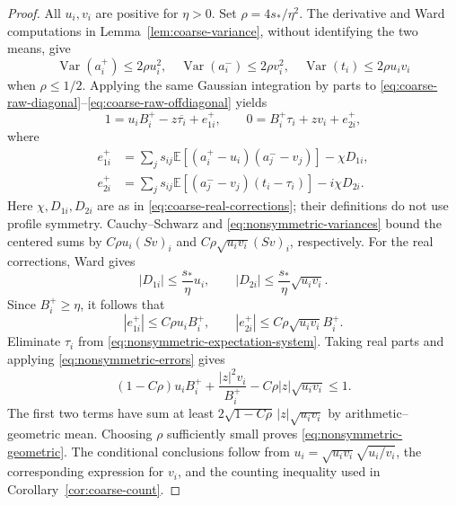 \documentclass[11pt,reqno]{amsart}
\numberwithin{equation}{section}
\theoremstyle{plain}
\theoremstyle{definition}
\theoremstyle{remark}
\begin{document}
\begin{proof}
All $u_i,v_i$ are positive for $\eta>0$.
Set $\rho=4s_*/\eta^2$.  The derivative and Ward computations in
Lemma~\ref{lem:coarse-variance}, without identifying the two means, give
\begin{equation}\label{eq:nonsymmetric-variances}
 \operatorname{Var}(a_i^+)\leq2\rho u_i^2,\quad
 \operatorname{Var}(a_i^-)\leq2\rho v_i^2,\quad
 \operatorname{Var}(t_i)\leq2\rho u_iv_i
\end{equation}
when $\rho\leq1/2$.
Applying the same Gaussian integration by parts to
\eqref{eq:coarse-raw-diagonal}--\eqref{eq:coarse-raw-offdiagonal} yields
\begin{equation}\label{eq:nonsymmetric-expectation-system}
 1=u_iB_i^+-z\overline{\tau_i}+e_{1i}^+,
 \qquad 0=B_i^+\tau_i+zv_i+e_{2i}^+,
\end{equation}
where
\begin{align*}
 e_{1i}^+
 &=\sum_js_{ij}\mathbb E[(a_i^+-u_i)(a_j^--v_j)]-\chi D_{1i},\\
 e_{2i}^+
 &=\sum_js_{ij}\mathbb E[(a_j^--v_j)(t_i-\tau_i)]-i\chi D_{2i}.
\end{align*}
Here $\chi,D_{1i},D_{2i}$ are as in
\eqref{eq:coarse-real-corrections}; their definitions do not use
profile symmetry.  Cauchy--Schwarz and
\eqref{eq:nonsymmetric-variances} bound the centered sums by
$C\rho u_i(Sv)_i$ and $C\rho\sqrt{u_iv_i}(Sv)_i$, respectively.
For the real corrections, Ward gives
\[
 |D_{1i}|\leq\frac{s_*}{\eta}u_i,\qquad
 |D_{2i}|\leq\frac{s_*}{\eta}\sqrt{u_iv_i}.
\]
Since $B_i^+\geq\eta$, it follows that
\begin{equation}\label{eq:nonsymmetric-errors}
 |e_{1i}^+|\leq C\rho u_iB_i^+,
 \qquad |e_{2i}^+|\leq C\rho\sqrt{u_iv_i}B_i^+.
\end{equation}
Eliminate $\tau_i$ from \eqref{eq:nonsymmetric-expectation-system}.
Taking real parts and applying \eqref{eq:nonsymmetric-errors} gives
\[
 (1-C\rho)u_iB_i^+
 +\frac{|z|^2v_i}{B_i^+}-C\rho|z|\sqrt{u_iv_i}\leq1.
\]
The first two terms have sum at least
$2\sqrt{1-C\rho}\,|z|\sqrt{u_iv_i}$ by arithmetic--geometric mean.
Choosing $\rho$ sufficiently small proves
\eqref{eq:nonsymmetric-geometric}.  The conditional conclusions follow
from $u_i=\sqrt{u_iv_i}\sqrt{u_i/v_i}$, the corresponding expression
for $v_i$, and the counting inequality used in
Corollary~\ref{cor:coarse-count}.
\end{proof}
\end{document}
